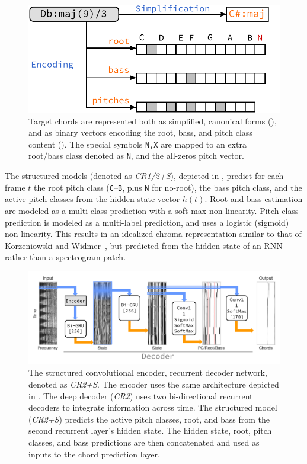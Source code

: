 \documentclass{article}
\begin{document}
\begin{figure}[t]
    \centering
    \includegraphics[width=0.9\columnwidth]{encoding}
    \caption{Target chords are represented both as simplified, canonical forms (), and as binary vectors encoding the root, bass, and pitch class content ().
    The special symbols \texttt{N,X} are mapped to an extra root/bass class denoted as \texttt{N}, and the all-zeros pitch vector.\label{fig:encoding}}
\end{figure}

The structured models (denoted as \emph{CR1/2+S}), depicted in , predict for each frame $t$ the root pitch class (\texttt{C}--\texttt{B}, plus \texttt{N} for no-root), the bass pitch class, and the active pitch classes from the hidden state vector $h(t)$.
Root and bass estimation are modeled as a multi-class prediction with a soft-max non-linearity.
Pitch class prediction is modeled as a multi-label prediction, and uses a logistic (sigmoid) non-linearity.
This results in an idealized chroma representation similar to that of Korzeniowski and Widmer~\cite{korzeniowski2016feature}, but predicted from the hidden state of an RNN rather than a spectrogram patch.

\begin{figure}[t]
    \centering
    \includegraphics[width=\columnwidth]{crnn2}
    \caption{The structured convolutional encoder, recurrent decoder network, denoted as \emph{CR2+S}.
    The encoder uses the same architecture depicted in .
    The deep decoder (\emph{CR2}) uses two bi-directional recurrent decoders to integrate information across time.
    The structured model (\emph{CR2+S}) predicts the active pitch classes, root, and bass from the second recurrent layer's hidden state.
    The hidden state, root, pitch classes, and bass predictions are then concatenated and used as inputs to the chord prediction layer.\label{fig:crnn2}}
\end{figure}
\end{document}

